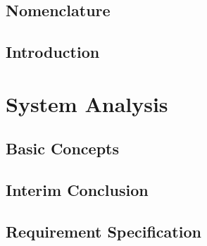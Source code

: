 
\graphicspath{{figures/}}


	






\setcounter{page}{1}
\renewcommand{\thepage}{\Roman{page}}




\setlength\parskip{0ex}
\tableofcontents
\setlength\parskip{1ex}

\chapter*{Nomenclature}\label{chap:acronym}
\printglossary[style=altlist,title=Glossary] %
\printglossary[type=\acronymtype,style=mcoltree] %
\printglossary[type=symbols,style=altlong4col] %
\clearpage








\cleardoublepage
\setcounter{page}{1}
\renewcommand{\thepage}{\arabic{page}}

\chapter{Introduction}\label{chap:intro}



\part{System Analysis}\label{part:part1}

\chapter{Basic Concepts}\label{basic_stuff}

\chapter{Interim Conclusion} \label{chap:interim_con}


\chapter{Requirement Specification}\label{chap:reqspec}


